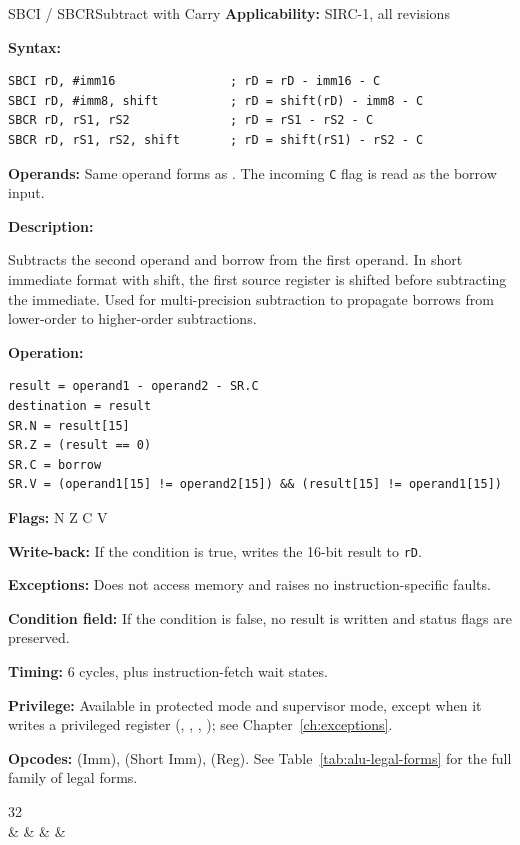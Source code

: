 \begin{instructionbox}{SBCI / SBCR}{Subtract with Carry}
	\textbf{Applicability:} SIRC-1, all revisions

	\textbf{Syntax:}
	\begin{lstlisting}
SBCI rD, #imm16                ; rD = rD - imm16 - C
SBCI rD, #imm8, shift          ; rD = shift(rD) - imm8 - C
SBCR rD, rS1, rS2              ; rD = rS1 - rS2 - C
SBCR rD, rS1, rS2, shift       ; rD = shift(rS1) - rS2 - C
\end{lstlisting}

	\textbf{Operands:} Same operand forms as . The incoming \texttt{C} flag is read as the borrow input.

	\textbf{Description:}

	Subtracts the second operand and borrow from the first operand. In short immediate format with shift, the first source
	register is shifted before subtracting the immediate. Used for multi-precision subtraction to propagate borrows from
	lower-order to higher-order subtractions.

	\textbf{Operation:}
	\begin{verbatim}
result = operand1 - operand2 - SR.C
destination = result
SR.N = result[15]
SR.Z = (result == 0)
SR.C = borrow
SR.V = (operand1[15] != operand2[15]) && (result[15] != operand1[15])
\end{verbatim}

	\textbf{Flags:} N Z C V

	\textbf{Write-back:} If the condition is true, writes the 16-bit result to \texttt{rD}.

	\textbf{Exceptions:} Does not access memory and raises no instruction-specific faults.

	\textbf{Condition field:} If the condition is false, no result is written and status flags are preserved.

	\textbf{Timing:} 6 cycles, plus instruction-fetch wait states.

	\textbf{Privilege:} Available in protected mode and supervisor mode, except when it writes a
	privileged register (, , , ); see Chapter~\ref{ch:exceptions}.

	\textbf{Opcodes:}  (Imm),  (Short Imm),  (Reg). See Table~\ref{tab:alu-legal-forms} for the full family of legal forms.

	\begin{center}
		\begin{bytefield}[bitwidth=1.1em]{32}
			 \\
			 &
			 &
			 &
			 &
		\end{bytefield}
	\end{center}


\end{instructionbox}
